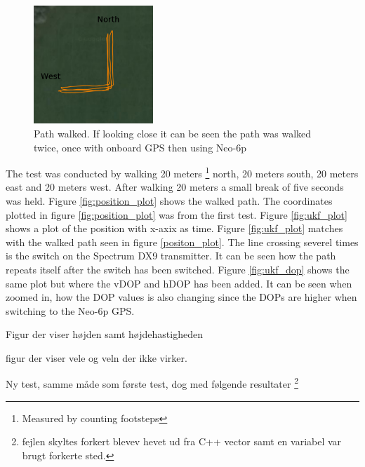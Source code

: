 \begin{figure}[H]
\centering
    \includegraphics[width=0.4\textwidth]	{graphics/test_walked_90deg.png}
	  \caption{Path walked. If looking close it can be seen the path was walked twice, once with onboard GPS then using Neo-6p}
    \label{fig:qground_station_dop}
\end{figure}
The test was conducted by walking 20 meters \footnote{Measured by counting footsteps} north, 20 meters south, 20 meters east and 20 meters west. After walking 20 meters a small break of five seconds was held. Figure \ref{fig:position_plot} shows the walked path.
The coordinates plotted in figure \ref{fig:position_plot} was from the first test. Figure \ref{fig:ukf_plot} shows a plot of the position with x-axix as time.
Figure \ref{fig:ukf_plot} matches with the walked path seen in figure \ref{positon_plot}. The line crossing severel times is the switch on the Spectrum DX9 transmitter. It can be seen how the path repeats itself after the switch has been switched.
Figure \ref{fig:ukf_dop} shows the same plot but where the vDOP and hDOP has been added. It can be seen when zoomed in, how the DOP values is also changing since the DOPs are higher when switching to the Neo-6p GPS.




Figur der viser højden samt højdehastigheden

figur der viser vele og veln der ikke virker.

Ny test, samme måde som første test, dog med følgende resultater \footnote{fejlen skyltes forkert blevev hevet ud fra C++ vector samt en variabel var brugt forkerte sted.}

\cite{kelddueholmmikkellaurentziusannab.o.jensen2015}





